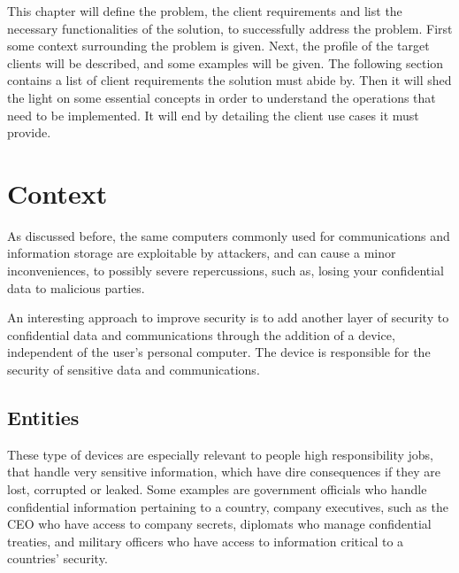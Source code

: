 \cleardoublepage
\label{chap:problem}

This chapter will define the problem, the client requirements and list the necessary functionalities of the solution, to successfully address the problem.
First some context surrounding the problem is given. 
Next, the profile of the target clients will be described, and some examples will be given.
The following section contains a list of client requirements the solution must abide by.
Then it will shed the light on some essential concepts in order to understand the operations that need to be implemented.
It will end by detailing the client use cases it must provide.

\section{Context}\label{chap:problem:context}
As discussed before, the same computers commonly used for communications and information storage are exploitable by attackers, and can cause a minor inconveniences, to possibly severe repercussions, such as, losing your confidential data to malicious parties.

An interesting approach to improve security is to add another layer of security to confidential data and communications through the addition of a device, independent of the user's personal computer. The device is responsible for the security of sensitive data and communications.


\subsection{Entities}\label{chap:problem:entities}

These type of devices are especially relevant to people high responsibility jobs, that handle very sensitive information, which have dire consequences if they are lost, corrupted or leaked.
Some examples are government officials who handle confidential information pertaining to a country, company executives, such as the CEO who have access to company secrets, diplomats who manage confidential treaties, and military officers who have access to information critical to a countries' security.

